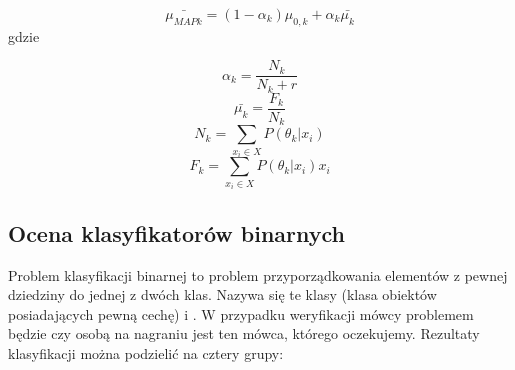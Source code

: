 $$\bar{\mu_{MAP k}} = (1 - \alpha_k) \mu_{0,k} + \alpha_k \bar{\mu_k}$$
gdzie

$$\alpha_k = \frac{N_k}{N_k + r}$$
$$\bar{\mu_k} = \frac{F_k}{N_k}$$
$$N_k = \sum_{x_i \in X} P(\theta_k | x_i)$$
$$F_k = \sum_{x_i \in X} P(\theta_k | x_i) x_i$$



%

%
%
%
%
%



\subsection{Ocena klasyfikatorów binarnych}

Problem klasyfikacji binarnej to problem przyporządkowania elementów z
pewnej dziedziny do jednej z dwóch klas. Nazywa się te klasy
 (klasa obiektów posiadających pewną cechę) i .
W przypadku weryfikacji mówcy problemem będzie czy osobą na nagraniu jest ten mówca, którego oczekujemy.
Rezultaty klasyfikacji można podzielić na cztery grupy:

